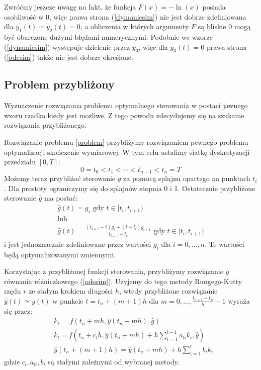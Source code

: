 \documentclass[11pt]{article}
\begin{document}
Zwróćmy jeszcze uwagę na fakt, że funkcja $F(x) = -\ln(x)$ posiada osobliwość w 0, więc prawa strona (\ref{dynamicsim}) nie jest dobrze zdefiniowana dla $y_1(t) = y_2(t) = 0$, a obliczenia w których argumenty $F$ są bliskie 0 mogą być obarczone dużymi błędami numerycznymi. Podobnie we wzorze (\ref{dynamicsim}) występuje dzielenie przez $y_3$, więc dla $y_3(t) = 0$ prawa strona (\ref{odesim}) także nie jest dobrze określone.

\subsection{Problem przybliżony}
Wyznaczenie rozwiązania problemu optymalnego sterowania w postaci jawnego wzoru rzadko kiedy jest możliwe. Z tego powodu zdecydujemy się na szukanie rozwiązania przybliżonego.

Rozwiązanie problemu \ref{problem} przybliżymy rozwiązaniem pewnego problemu optymalizacji skończenie wymiarowej. W tym celu ustalimy siatkę dyskretyzacji przedziału $[0, T]$:
\begin{equation}
  0 = t_0 < t_1 < \cdots < t_{n-1} < t_n = T
\end{equation}
Możemy teraz przybliżać sterowanie $g$ za pomocą splajnu opartego na punktach $t_{i}$. Dla prostoty ograniczymy się do splajnów stopnia 0 i 1. Ostatecznie przybliżone sterowanie $\hat{g}$ ma postać:
\begin{gather}  
    \hat{g}(t) = g_i \text{ gdy } t \in [t_{i}, t_{i + 1}) \label{control_1}\\
    \nonumber \text{lub} \\
    \hat{g}(t) = \frac{(t_{i+1} - t)g_i + (t - t_i)g_{i+1}}{t_{i+1} - t_i} \text{ gdy } t \in [t_i, t_{i+1}) \label{control_2}
\end{gather}
i jest jednoznacznie zdefiniowane przez wartości $g_i$ dla $i = 0,\ldots, n$. Te wartości będą optymalizowanymi zmiennymi.

Korzystając z przybliżonej funkcji sterowania, przybliżymy rozwiązanie $y$ równania różniczkowego (\ref{odesim}). Użyjemy do tego metody Rungego-Kutty rzędu $r$ ze stałym krokiem długości $h$, wtedy przybliżone rozwiązanie $\hat{y}(t) \simeq y(t)$ w punkcie $t = t_n + (m + 1)h$ dla $m = 0,\ldots, \frac{t_{n+1}-t_n}{h} - 1$  wyraża się przez:
\begin{equation} \label{rk}
  \begin{split}
    &k_1 = f(t_n + mh, \hat{y}(t_n + mh), \hat{g}) \\
    &k_l = f(t_n + c_l h, \hat{y}(t_n + mh) + h \sum_{i = 1}^{l-1} a_{li}k_i, \hat{g}) \\
    &\hat{y}(t_n + (m+1)h) = \hat{y}(t_n + mh) + h \sum_{i = 1}^r b_i k_i
  \end{split}
\end{equation}
gdzie $c_l, a_{li}, b_i$ są stałymi zależnymi od wybranej metody.
\end{document}
